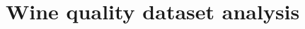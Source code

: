 \documentclass{article}
\begin{document}
\section{Wine quality dataset analysis}
\label{Appendice_Wine}
    
    

    
\end{document}

